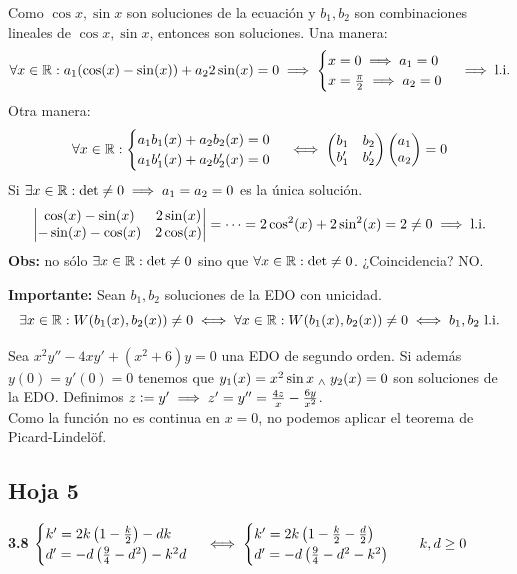 Como $\cos{x}, \sin{x}$ son soluciones de la ecuación y $b_1, b_2$ son combinaciones lineales de $\cos{x}, \sin{x}$, entonces son soluciones.
Una manera: \[\forall x \in \mathbb{R} : a_1(\cos(x) - \sin(x)) + a_2 2 \sin(x) = 0 \implies \begin{cases}
		x= 0 \implies a_1 = 0 \\
		x= \frac{\pi}{2} \implies a_2 = 0
	\end{cases}\implies \text{l.i.}\]
Otra manera:
\[\forall x \in \mathbb{R} : \begin{cases}
		a_1b_1(x) + a_2b_2(x) = 0 \\
		a_1b_1'(x) + a_2b_2'(x) = 0
	\end{cases} \iff \begin{pmatrix}
		b_1  & b_2  \\
		b_1' & b_2'
	\end{pmatrix} \begin{pmatrix}
		a_1 \\
		a_2
	\end{pmatrix} = 0\]
Si $\exists x \in \mathbb{R} : \det \neq 0 \implies a_1 = a_2 = 0$ es la única solución.
\[\begin{vmatrix}
		\cos(x) - \sin(x)  & 2\sin(x) \\
		-\sin(x) - \cos(x) & 2\cos(x)
	\end{vmatrix} = \cdots = 2\cos^2(x) + 2\sin^2(x) = 2 \neq 0 \implies \text{l.i.}\]
\textbf{Obs:} no sólo $\exists x\in \mathbb{R} : \det \neq 0$ sino que $\forall x \in \mathbb{R} : \det \neq 0$. ¿Coincidencia? NO.

\textbf{Importante:} Sean $b_1, b_2$ soluciones de la EDO con unicidad.
\[\exists x \in \mathbb{R} : W(b_1(x), b_2(x)) \neq 0 \iff \forall x \in \mathbb{R} : W(b_1(x), b_2(x)) \neq 0 \iff b_1, b_2 \text{ l.i.}\]

Sea $x^2y'' - 4xy'+(x^2+6)y = 0$ una EDO de segundo orden. Si además $y(0) = y'(0) = 0$ tenemos que $y_1(x)=x^2\sin{x} \; _{\wedge} \; y_2(x)= 0$ son soluciones de la EDO. Definimos $z\vcentcolon= y' \implies z' = y'' = \frac{4z}{x} - \frac{6y}{x^2}$.\\

Como la función no es continua en $x=0$, no podemos aplicar el teorema de Picard-Lindelöf.

\subsection{Hoja 5}

\textbf{3.8} $\displaystyle \begin{cases}
		k' = 2k\left(1-\frac{k}{2}\right) - dk \\
		d' = -d\left(\frac{9}{4} - d^2\right) -k^2d
	\end{cases} \iff \begin{cases}
		k' = 2k\left(1-\frac{k}{2} - \frac{d}{2}\right) \\
		d' = -d\left(\frac{9}{4} - d^2 - k^2\right)
	\end{cases} \quad k,d \geq 0$

